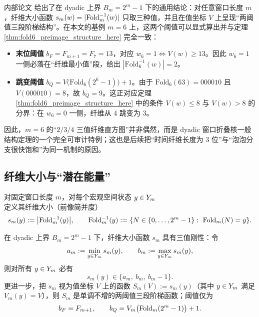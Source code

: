 \begin{remark}\label{rem:align_dyadic_three_valued_fiber}
内部论文 \cite{Internal2026DyadicZeckendorfWindowFoldingKernel} 给出了在 dyadic 上界 \(B_m=2^m-1\) 下的通用结论：对任意窗口长度 \(m\)，纤维大小函数 \(s_m(w)=|\mathrm{Fold}_m^{-1}(w)|\) 只取三种值，并且在值坐标 \(V\) 上呈现“两阈值三段阶梯结构”。在本文的基例 \(m=6\) 上，这两个阈值可以显式算出并与定理 \ref{thm:fold6_preimage_structure_here} 完全一致：
\begin{itemize}
  \item \textbf{末位阈值} \(b_F=F_{m+1}=F_7=13\)，对应 \(w_6=1\iff V(w)\ge 13\)。因此 \(w_6=1\) 一侧必落在“纤维最小值”段，给出 \(|\mathrm{Fold}_6^{-1}(w)|=2\)。
  \item \textbf{跳变阈值} \(b_Q=V\bigl(\mathrm{Fold}_6(2^6-1)\bigr)+1\)。由于 \(\mathrm{Fold}_6(63)=000010\) 且 \(V(000010)=8\)，故 \(b_Q=9\)。这正对应定理 \ref{thm:fold6_preimage_structure_here} 中的条件 \(V(w)\le 8\) 与 \(V(w)>8\) 的分界：在 \(w_6=0\) 一侧，纤维从 \(4\) 跳变为 \(3\)。
\end{itemize}
因此，\(m=6\) 的“\(2/3/4\) 三值纤维直方图”并非偶然，而是 dyadic 窗口折叠核一般结构定理的一个完全可审计特例；这也是后续把“时间纤维长度为 3 位”与“泡泡分支很快饱和”为同一机制的原因。
\end{remark}

\subsection{纤维大小与“潜在能量”}
\begin{definition}[纤维大小函数]\label{def:fiber_size_function}
对固定窗口长度 \(m\)，对每个宏观空间状态 \(y\in Y_m\) 定义其纤维大小（前像简并度）
$$
s_m(y):=\bigl|\mathrm{Fold}_m^{-1}(y)\bigr|,\qquad \mathrm{Fold}_m^{-1}(y):=\{N\in\{0,\dots,2^m-1\}:\ \mathrm{Fold}_m(N)=y\}.
$$
\end{definition}

\begin{theorem}\label{thm:three_valued_fiber_general}
在 dyadic 上界 \(B_m=2^m-1\) 下，纤维大小函数 \(s_m\) 具有三值刚性：令
$$
a_m:=\min_{y\in Y_m}s_m(y),\qquad b_m:=\max_{y\in Y_m}s_m(y),
$$
则对所有 \(y\in Y_m\) 必有
$$
s_m(y)\in\{a_m,\ b_m,\ b_m-1\}.
$$
更进一步，把 \(s_m\) 视为值坐标 \(V\) 上的函数 \(S_m(V):=s_m(y)\)（其中 \(y\in Y_m\) 满足 \(V_m(y)=V\)），则 \(S_m\) 是单调不增的两阈值三段阶梯函数；阈值仅为
$$
b_F=F_{m+1},\qquad b_Q=V_m\bigl(\mathrm{Fold}_m(2^m-1)\bigr)+1.
$$
\end{theorem}


